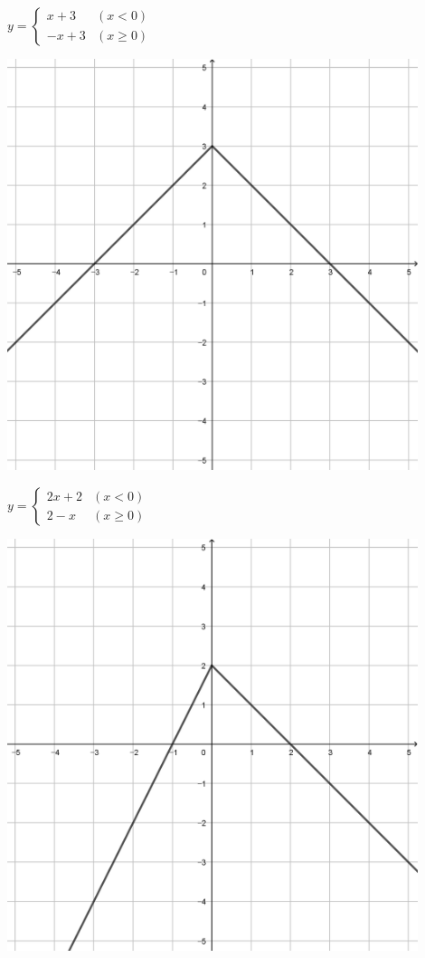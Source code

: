 \documentclass[a4paper]{oblivoir}
\begin{document}
\clearpage
\begin{minipage}{0.45\textwidth}\centering
\(y=\begin{cases}x+3&(x<0)\\-x+3&(x\ge0)\end{cases}\)
\par\bigskip\includegraphics[width=0.9\textwidth]{img/3_piecewise_1}
\end{minipage}
\begin{minipage}{0.45\textwidth}\centering
\(y=\begin{cases}2x+2&(x<0)\\2-x&(x\ge0)\end{cases}\)
\par\bigskip\includegraphics[width=0.9\textwidth]{img/3_piecewise_2}
\end{minipage}\bigskip\bigskip\par
\end{document}
